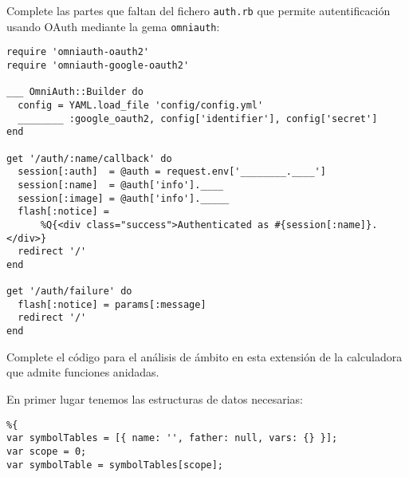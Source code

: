 \item 
Complete las partes que faltan del fichero \verb|auth.rb| que permite 
autentificación usando OAuth mediante la gema \verb|omniauth|:
\begin{verbatim}
require 'omniauth-oauth2'
require 'omniauth-google-oauth2'

___ OmniAuth::Builder do
  config = YAML.load_file 'config/config.yml'
  ________ :google_oauth2, config['identifier'], config['secret']
end

get '/auth/:name/callback' do
  session[:auth]  = @auth = request.env['________.____']
  session[:name]  = @auth['info'].____
  session[:image] = @auth['info']._____
  flash[:notice] = 
      %Q{<div class="success">Authenticated as #{session[:name]}.</div>}
  redirect '/'
end

get '/auth/failure' do
  flash[:notice] = params[:message] 
  redirect '/'
end
\end{verbatim}

\item 
Complete el código para el análisis de ámbito en esta extensión de la 
calculadora que admite funciones anidadas.

En primer lugar tenemos las estructuras de datos necesarias:
\begin{verbatim}
%{
var symbolTables = [{ name: '', father: null, vars: {} }];
var scope = 0; 
var symbolTable = symbolTables[scope];
\end{verbatim}

